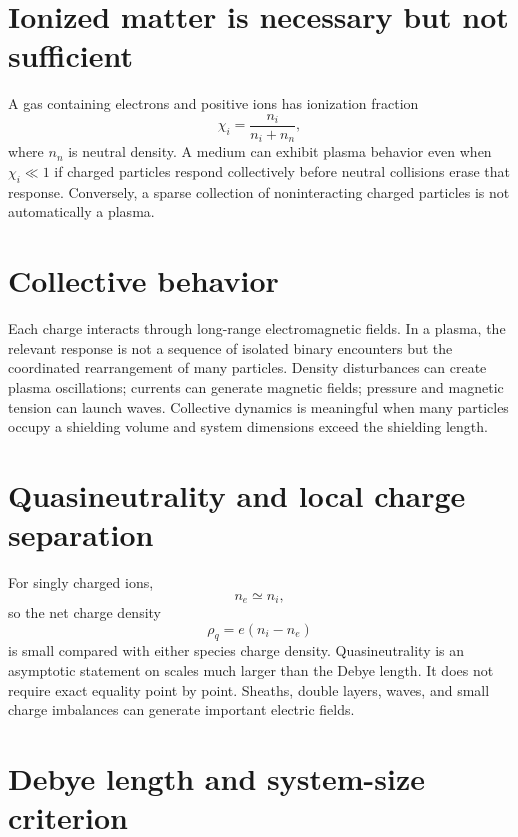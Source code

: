 \documentclass[11pt]{article}
\begin{document}
\section{Ionized matter is necessary but not sufficient}

A gas containing electrons and positive ions has ionization fraction
\begin{equation}
\chi_i=\frac{n_i}{n_i+n_n},
\end{equation}
where $n_n$ is neutral density. A medium can exhibit plasma behavior even when $\chi_i\ll1$ if charged particles respond collectively before neutral collisions erase that response. Conversely, a sparse collection of noninteracting charged particles is not automatically a plasma.


\section{Collective behavior}

Each charge interacts through long-range electromagnetic fields. In a plasma, the relevant response is not a sequence of isolated binary encounters but the coordinated rearrangement of many particles. Density disturbances can create plasma oscillations; currents can generate magnetic fields; pressure and magnetic tension can launch waves. Collective dynamics is meaningful when many particles occupy a shielding volume and system dimensions exceed the shielding length.


\section{Quasineutrality and local charge separation}

For singly charged ions,
\begin{equation}
n_e\simeq n_i,
\end{equation}
so the net charge density
\begin{equation}
\rho_q=e(n_i-n_e)
\end{equation}
is small compared with either species charge density. Quasineutrality is an asymptotic statement on scales much larger than the Debye length. It does not require exact equality point by point. Sheaths, double layers, waves, and small charge imbalances can generate important electric fields.


\section{Debye length and system-size criterion}
\end{document}
